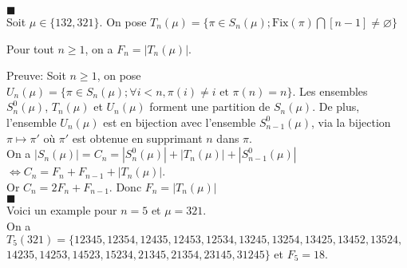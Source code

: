 $\blacksquare$\vspace{10pt}\\
	Soit $\mu \in \{132, 321\}$. On pose $T_{n}(\mu)= \{\pi \in S_{n}(\mu); \text{Fix}(\pi)\bigcap [n-1]\neq \varnothing\}$
	\begin{proposition}
		Pour tout $n\geq 1$, on a $ F_{n}=|T_{n}(\mu)|$.
	\end{proposition}
	Preuve:
	Soit $n\geq 1$, on pose $U_{n}(\mu) = \{\pi \in S_{n}(\mu); \forall i<n, \pi(i)\neq i \text{ et } \pi(n)=n\}$. Les ensembles $S_{n}^{0}(\mu)$, $T_{n}(\mu)$ et $U_{n}(\mu)$ forment une partition de $S_{n}(\mu)$. De plus, l'ensemble $U_{n}(\mu)$ est en bijection avec l'ensemble $S_{n-1}^{0}(\mu)$, via la bijection $\pi \mapsto \pi'$ où $\pi'$ est obtenue en supprimant $n$ dans $\pi$. \\
	On a $| S_{n}(\mu) | = C_{n} = |S_{n}^{0}(\mu)| + |T_{n}(\mu)| + |S_{n-1}^{0}(\mu)|$
$\iff C_{n} = F_{n}+F_{n-1} + |T_{n}(\mu)|$.\\
	Or $C_{n} = 2F_{n} +F_{n-1}$. Donc $ F_{n} = | T_{n}(\mu) |$\\ $\blacksquare$\\
	Voici un example pour $n=5$ et $\mu=321$.\\
 On a $T_{5}(321)=\{12345, 12354, 12435, 12453, 12534, 13245, 13254, 13425, 
 13452, 13524, $ \\$14235, 14253,  14523, 15234, 21345, 21354, 23145, 31245\}$ et $F_{5}=18$.
